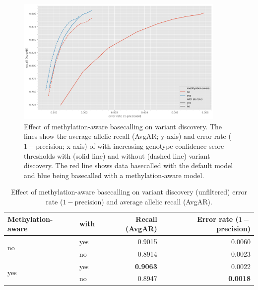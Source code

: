 \begin{figure}
    \centering
    \includegraphics[width=0.9\textwidth]{Chapter1/Figs/pandora_basecaller_roc.png}
    \caption{Effect of \ont{} methylation-aware basecalling on \pandora{} \denovo{} variant discovery. The lines show the average allelic recall (AvgAR; y-axis) and error rate ($1-$precision; x-axis) of \pandora{} with increasing genotype confidence score thresholds with (solid line) and without (dashed line) \denovo{} variant discovery. The red line shows data basecalled with the default \guppy{} model and blue being basecalled with a methylation-aware model.}
    \label{fig:denovo-methylation}
\end{figure}

\begin{table}
\centering
\begin{tabular}{@{}llrr@{}}
\toprule
    Methylation-aware    & with \denovo{} & Recall (AvgAR)  & Error rate ($1-$precision) \\ \midrule
\multirow{2}{*}{no}  & yes                   & 0.9015          & 0.0060                   \\
                     & no                    & 0.8914          & 0.0023                   \\
\multirow{2}{*}{yes} & yes                   & \textbf{0.9063} & 0.0022                   \\
                     & no                    & 0.8947          & \textbf{0.0018}          \\ \cmidrule(l){2-4} 
\end{tabular}
    \caption{Effect of \ont{} methylation-aware basecalling on \pandora{} \denovo{} variant discovery (unfiltered) error rate ($1-$precision) and average allelic recall (AvgAR).}
\label{tab:denovo-methylation}
\end{table}


